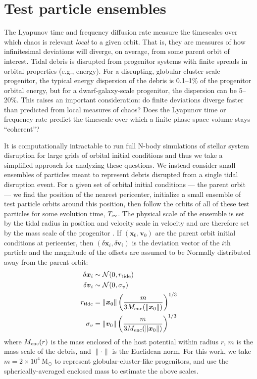 \documentclass[letterpaper,12pt,preprint]{aastex}
\newcommand{\msun}{\mathrm{M}_\odot}
\newcommand{\bs}[1]{\boldsymbol{#1}}
\begin{document}
\section{Test particle ensembles} \label{sec:ensemble}

The Lyapunov time and frequency diffusion rate measure the timescales over which chaos is relevant \emph{local} to a given orbit. That is, they are measures of how infinitesimal deviations will diverge, on average, from some parent orbit of interest. Tidal debris is disrupted from progenitor systems with finite spreads in orbital properties (e.g., energy). For a disrupting, globular-cluster-scale progenitor, the typical energy dispersion of the debris is 0.1--1\% of the progenitor orbital energy, but for a dwarf-galaxy-scale progenitor, the dispersion can be 5--20\%. This raises an important consideration: do finite deviations diverge faster than predicted from local measures of chaos? Does the Lyapunov time or frequency rate predict the timescale over which a finite phase-space volume stays ``coherent''?

It is computationally intractable to run full N-body simulations of stellar system disruption for large grids of orbital initial conditions and thus we take a simplified approach for analyzing these questions. We instead consider small ensembles of particles meant to represent debris disrupted from a single tidal disruption event. For a given set of orbital initial conditions --- the parent orbit --- we find the position of the nearest pericenter, initialize a small ensemble of test particle orbits around this position, then follow the orbits of all of these test particles for some evolution time, $T_{\rm ev}$. The physical scale of the ensemble is set by the tidal radius in position and velocity scale in velocity and are therefore set by the mass scale of the progenitor \citep[e.g.,][]{johnston98, apw14}. If $(\bs{x}_0,\bs{v}_0)$ are the parent orbit initial conditions at pericenter, then $(\delta\bs{x}_i,\delta\bs{v}_i)$ is the deviation vector of the $i$th particle and the magnitude of the offsets are assumed to be Normally distributed away from the parent orbit:
\begin{align}
	\delta\bs{x}_i &\sim \mathcal{N}(0, r_{\rm tide})\\
	\delta\bs{v}_i &\sim \mathcal{N}(0, \sigma_v)\\
	r_{\rm tide} &= \|\bs{x}_0\| \left(\frac{m}{3M_{\rm enc}(\|\bs{x}_0\|)}\right)^{1/3} \\
	\sigma_v &= \|\bs{v}_0\|\left(\frac{m}{3M_{\rm enc}(\|\bs{x}_0\|)}\right)^{1/3} 
\end{align}
where $M_{\rm enc}(r)$ is the mass enclosed of the host potential within radius $r$, $m$ is the mass scale of the debris, and $\|\cdot \|$ is the Euclidean norm. For this work, we take $m=2\times10^4~\msun$ to represent globular-cluster-like progenitors, and use the spherically-averaged enclosed mass to estimate the above scales.
\end{document}
